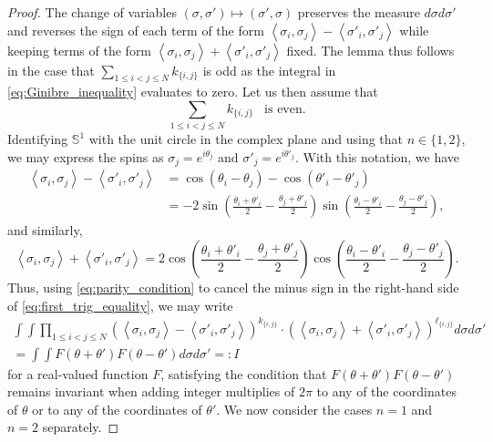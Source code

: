 \documentclass[12pt,reqno]{article}
\renewcommand{\S}{\mathbb{S}}
\begin{document}
\begin{proof}
The change of variables $(\sigma, \sigma')\mapsto(\sigma', \sigma)$ preserves the measure $d\sigma d\sigma'$ and reverses the sign of each term of the form $\left\langle\sigma_i,\sigma_j\right\rangle - \left\langle\sigma'_i,\sigma'_j\right\rangle$ while keeping terms of the form $\left\langle\sigma_i,\sigma_j\right\rangle + \left\langle\sigma'_i,\sigma'_j\right\rangle$ fixed. The lemma thus follows in the case that $\sum_{1\le i<j\le N} k_{\{i,j\}}$ is odd as the integral in \eqref{eq:Ginibre_inequality} evaluates to zero. Let us then assume that
\begin{equation}\label{eq:parity_condition}
  \sum_{1\le i<j\le N}  k_{\{i,j\}}\;\;\;\text{is even}.
\end{equation}
  Identifying $\S^1$ with the unit circle in the complex plane and using that $n\in\{1,2\}$, we may express the spins as $\sigma_j = e^{i\theta_j}$ and $\sigma'_j = e^{i\theta'_j}$. With this notation, we have
  \begin{equation}\label{eq:first_trig_equality}
  \begin{split}
    \left\langle\sigma_i,\sigma_j\right\rangle - \left\langle\sigma'_i,\sigma'_j\right\rangle &= \cos(\theta_i - \theta_j) - \cos(\theta'_i - \theta'_j)\\
     &= -2\sin\left(\frac{\theta_i + \theta'_i}{2} - \frac{\theta_j + \theta'_j}{2}\right)\sin\left(\frac{\theta_i - \theta'_i}{2} - \frac{\theta_j - \theta'_j}{2}\right) ,
  \end{split}
  \end{equation}
  and similarly,
  \begin{equation*}
    \left\langle\sigma_i,\sigma_j\right\rangle + \left\langle\sigma'_i,\sigma'_j\right\rangle = 2\cos\left(\frac{\theta_i + \theta'_i}{2} - \frac{\theta_j + \theta'_j}{2}\right)\cos\left(\frac{\theta_i - \theta'_i}{2} - \frac{\theta_j - \theta'_j}{2}\right).
  \end{equation*}
  Thus, using \eqref{eq:parity_condition} to cancel the minus sign in the right-hand side of \eqref{eq:first_trig_equality}, we may write
  \begin{multline*}
    \int\int \prod_{1\le i<j\le N} (\left\langle\sigma_i,\sigma_j\right\rangle - \left\langle\sigma'_i,\sigma'_j\right\rangle)^{k_{\{i,j\}}}\cdot (\left\langle\sigma_i,\sigma_j\right\rangle + \left\langle\sigma'_i,\sigma'_j\right\rangle)^{\ell_{\{i,j\}}} d\sigma d\sigma'\\
    = \int \int F(\theta + \theta')F(\theta-\theta')d\sigma d\sigma' =: I
  \end{multline*}
  for a real-valued function $F$, satisfying the condition that $F(\theta + \theta')F(\theta-\theta')$ remains invariant when adding integer multiplies of $2\pi$ to any of the coordinates of $\theta$ or to any of the coordinates of $\theta'$. We now consider the cases $n=1$ and $n=2$ separately.


\end{proof}
\end{document}
